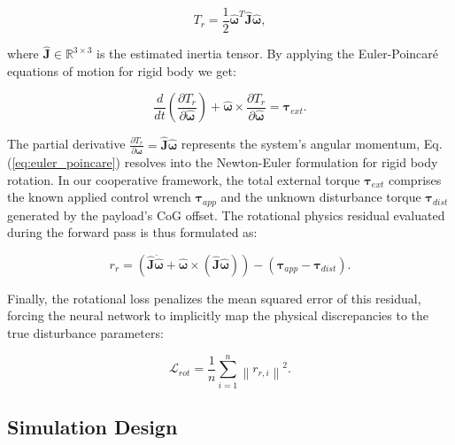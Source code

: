 \begin{equation}
    T_{r} = \frac{1}{2} \hat{\boldsymbol{\omega}}^T \hat{\mathbf{J}} \hat{\boldsymbol{\omega}},
\end{equation}

\noindent where $\mathbf{\hat{J}} \in \mathbb{R}^{3 \times 3}$ is the estimated inertia tensor. By applying the Euler-Poincaré equations of motion for rigid body we get:

\begin{equation}
    \frac{d}{dt} \left( \frac{\partial T_{r}}{\partial \hat{\boldsymbol{\omega}}} \right) + \hat{\boldsymbol{\omega}} \times \frac{\partial T_{r}}{\partial \hat{\boldsymbol{\omega}}} = \boldsymbol{\tau}_{ext} \label{eq:euler_poincare}.
\end{equation}

The partial derivative $\frac{\partial T_{r}}{\partial \boldsymbol{\omega}} = \mathbf{\hat{J}} \boldsymbol{\hat{\omega}}$ represents the system's angular momentum, Eq. (\ref{eq:euler_poincare}) resolves into the Newton-Euler formulation for rigid body rotation. In our cooperative framework, the total external torque $\boldsymbol{\tau}_{ext}$ comprises the known applied control wrench $\boldsymbol{\tau}_{app}$ and the unknown disturbance torque $\boldsymbol{\tau}_{dist}$ generated by the payload's CoG offset. The rotational physics residual evaluated during the forward pass is thus formulated as:

\begin{equation}
    r_{r} = \left( \mathbf{\hat{J}} \mathbf{\dot{\hat{\boldsymbol{\omega}}}} + \boldsymbol{\hat{\omega}} \times (\mathbf{\hat{J}} \boldsymbol{\hat{\omega}}) \right) - \left( \boldsymbol{\tau}_{app} - \boldsymbol{\tau}_{dist} \right).
\end{equation}

Finally, the rotational loss penalizes the mean squared error of this residual, forcing the neural network to implicitly map the physical discrepancies to the true disturbance parameters:

\begin{equation}
    \mathcal{L}_{rot} = \frac{1}{n} \sum_{i=1}^{n} \left\lVert r_{r, i} \right\rVert^2 \label{eq:rot_loss}.
\end{equation}

\subsection{Simulation Design}

